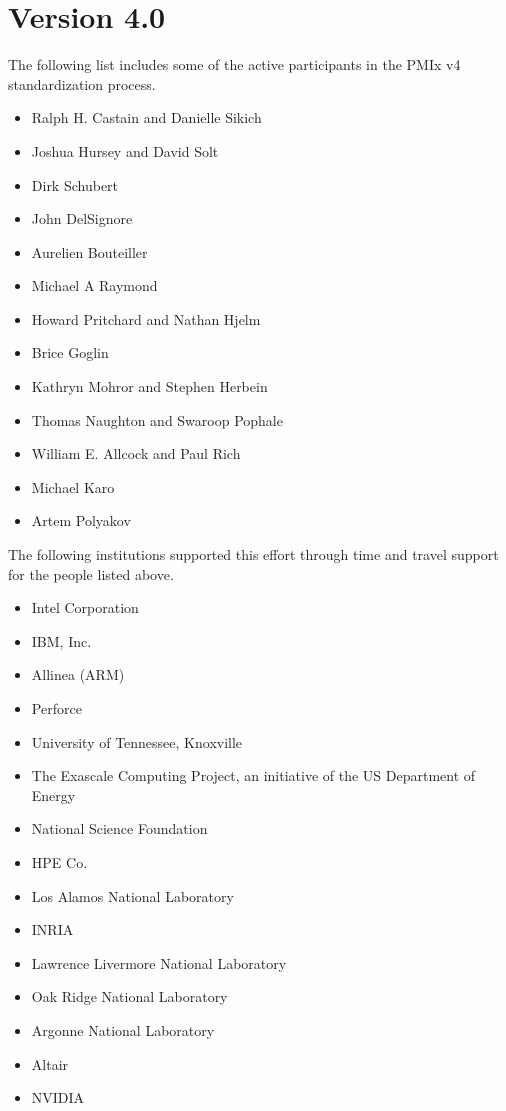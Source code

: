 \section{Version 4.0}

The following list includes some of the active participants in the PMIx v4 standardization process.

\begin{itemize}
\item Ralph H. Castain and Danielle Sikich
\item Joshua Hursey and David Solt
\item Dirk Schubert
\item John DelSignore
\item Aurelien Bouteiller
\item Michael A Raymond
\item Howard Pritchard and Nathan Hjelm
\item Brice Goglin
\item Kathryn Mohror and Stephen Herbein
\item Thomas Naughton and Swaroop Pophale
\item William E. Allcock and Paul Rich
\item Michael Karo
\item Artem Polyakov
\end{itemize}

The following institutions supported this effort through time and travel support for the people listed above.

\begin{itemize}
\item Intel Corporation
\item IBM, Inc.
\item Allinea (ARM)
\item Perforce
\item University of Tennessee, Knoxville
\item The Exascale Computing Project, an initiative of the US Department of Energy
\item National Science Foundation
\item HPE Co.
\item Los Alamos National Laboratory
\item INRIA
\item Lawrence Livermore National Laboratory
\item Oak Ridge National Laboratory
\item Argonne National Laboratory
\item Altair
\item NVIDIA
\end{itemize}

